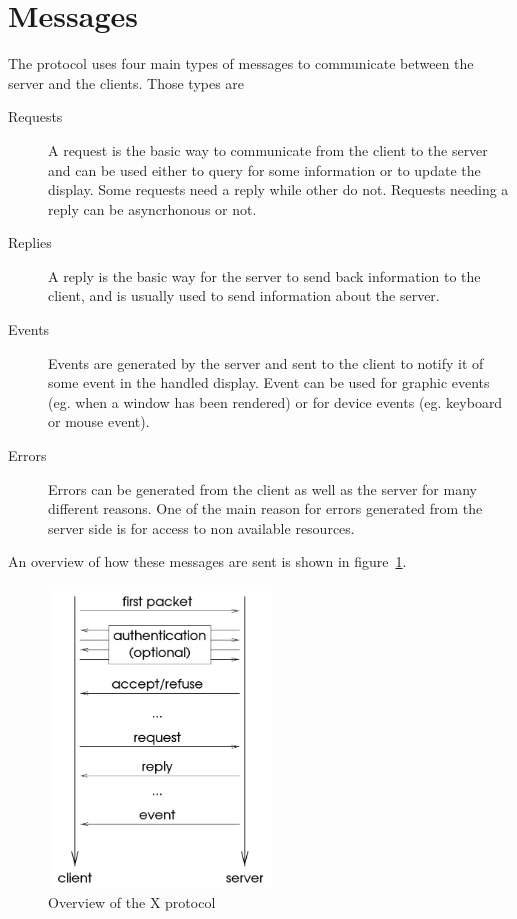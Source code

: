 \section{Messages}
The protocol uses four main types of messages to communicate between 
the server and the clients. Those types are
\begin{description}
\item[Requests] A request is the basic way to communicate from the client 
  to the server and can be used either to query for some information or to 
  update the display. Some requests need a reply while other do not. 
  Requests needing a reply can be asyncrhonous or not.
\item[Replies] A reply is the basic way for the server to send back
  information to the client, and is usually used to send information about the server.
\item[Events] Events are generated by the server and sent to the client to notify it of 
  some event in the handled display. Event can be used for graphic events 
  (eg. when a window has been rendered) or for device events (eg. keyboard or mouse event).
\item[Errors] Errors can be generated from the client as well as the server
  for many different reasons. One of the main reason for errors generated 
  from the server side is for access to non available resources.
\end{description}
An overview of how these messages are sent is shown in figure~\ref{fig:xcore-overview}.
\begin{figure}[tb]
  \begin{center}
    \includegraphics[height=8cm,width=6cm]{imgs/xcore-overview.png}
    \caption{\label{fig:xcore-overview}Overview of the X protocol \protect\footnotemark}
  \end{center}
\end{figure}
